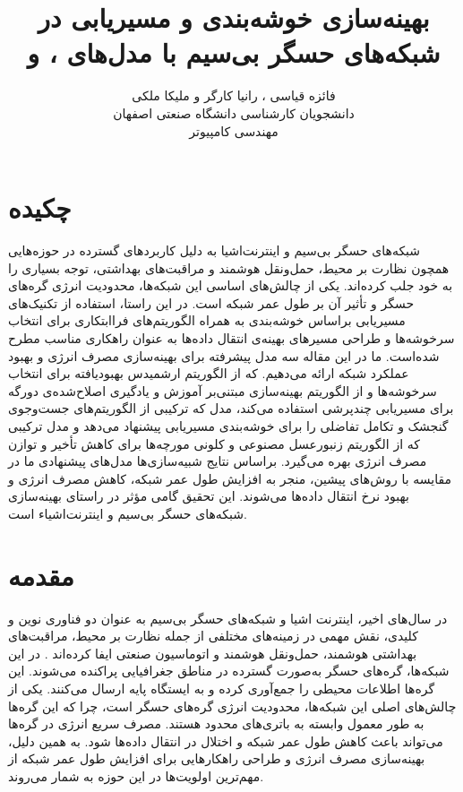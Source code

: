 \documentclass[11.5pt,onecolumn,a4paper]{article}
\begin{document}
	
	
	\title{بهینه‌سازی خوشه‌بندی و مسیر‌یابی در شبکه‌های حسگر بی‌سیم با مدل‌های ،  و } 
	\author{فائزه قیاسی ، رانیا کارگر و ملیکا ملکی\\
		دانشجویان کارشناسی دانشگاه صنعتی اصفهان\\
		مهندسی کامپیوتر}
	\date{}
	\maketitle
	
	\section*{چکیده}
	شبکه‌های حسگر بی‌سیم و اینترنت‌اشیا به دلیل کاربردهای گسترده در حوزه‌هایی همچون نظارت بر محیط، حمل‌ونقل هوشمند و مراقبت‌های بهداشتی، توجه بسیاری را به خود جلب کرده‌اند. یکی از چالش‌های اساسی این شبکه‌ها، محدودیت انرژی گره‌های حسگر و تأثیر آن بر طول عمر شبکه است. در این راستا، استفاده از تکنیک‌های مسیریابی براساس خوشه‌بندی به‌ همراه الگوریتم‌های فراابتکاری برای انتخاب سرخوشه‌ها و طراحی مسیرهای بهینه‌ی انتقال داده‌ها به عنوان راهکاری مناسب مطرح شده‌است. ما در این مقاله سه مدل پیشرفته برای بهینه‌سازی مصرف انرژی و بهبود عملکرد شبکه ارائه می‌دهیم.  که از الگوریتم ارشمیدس بهبودیافته برای انتخاب سرخوشه‌ها و از الگوریتم بهینه‌سازی مبتنی‌بر آموزش و یادگیری اصلاح‌شده‌ی دورگه برای مسیریابی چندپرشی استفاده می‌کند، مدل  که ترکیبی از الگوریتم‌های جست‌وجوی گنجشک و تکامل تفاضلی را برای خوشه‌بندی مسیریابی پیشنهاد می‌دهد و مدل ترکیبی  که از الگوریتم زنبورعسل مصنوعی و کلونی مورچه‌ها برای کاهش تأخیر و توازن مصرف انرژی بهره می‌گیرد. براساس نتایج شبیه‌سازی‌ها مدل‌های پیشنهادی ما در مقایسه با روش‌های پیشین، منجر به افزایش طول عمر شبکه، کاهش مصرف انرژی و بهبود نرخ انتقال داده‌ها می‌شوند. این تحقیق گامی مؤثر در راستای بهینه‌سازی شبکه‌های حسگر بی‌سیم و اینترنت‌اشیاء است.
	\newpage
	\section*{مقدمه}
	\hspace*{1em}در سال‌های اخیر، اینترنت اشیا و شبکه‌های حسگر بی‌سیم به عنوان دو فناوری نوین و کلیدی، نقش مهمی در زمینه‌های مختلفی از جمله نظارت بر محیط، مراقبت‌های بهداشتی هوشمند، حمل‌ونقل هوشمند و اتوماسیون صنعتی ایفا کرده‌اند \cite{ref1, ref2, ref3}. در این شبکه‌ها، گره‌های حسگر به‌صورت گسترده در مناطق جغرافیایی پراکنده می‌شوند. این گره‌ها اطلاعات محیطی را جمع‌آوری کرده و به ایستگاه‌ پایه ارسال می‌کنند. یکی از چالش‌های اصلی این شبکه‌ها، محدودیت انرژی گره‌های حسگر است، چرا که این گره‌ها به طور معمول وابسته به باتری‌های محدود هستند. مصرف سریع انرژی در گره‌ها می‌تواند باعث کاهش طول عمر شبکه و اختلال در انتقال داده‌ها شود. به همین دلیل، بهینه‌سازی مصرف انرژی و طراحی راهکارهایی برای افزایش طول عمر شبکه از مهم‌ترین اولویت‌ها در این حوزه به‌ شمار می‌روند.
	
\end{document}
